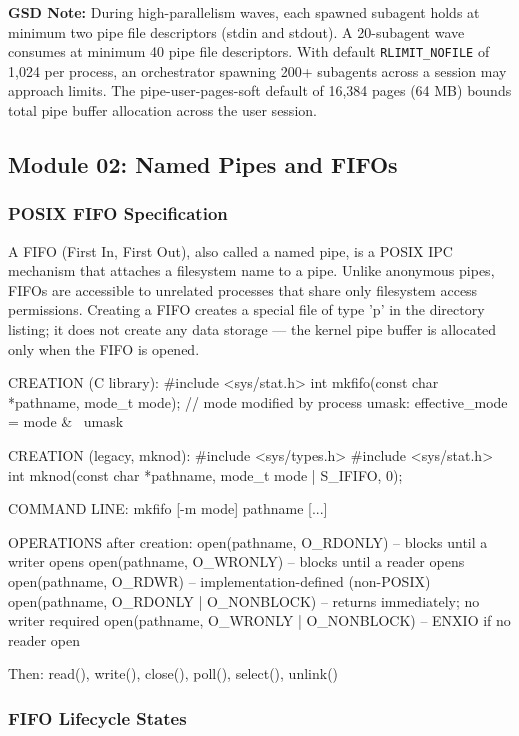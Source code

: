 \documentclass[11pt,letterpaper]{article}
\begin{document}
\textbf{GSD Note:} During high-parallelism waves, each spawned subagent holds at minimum two pipe file descriptors (stdin and stdout). A 20-subagent wave consumes at minimum 40 pipe file descriptors. With default \texttt{RLIMIT\_NOFILE} of 1,024 per process, an orchestrator spawning 200+ subagents across a session may approach limits. The pipe-user-pages-soft default of 16,384 pages (64 MB) bounds total pipe buffer allocation across the user session.

\subsection{Module 02: Named Pipes and FIFOs}

\subsubsection{POSIX FIFO Specification}

A FIFO (First In, First Out), also called a named pipe, is a POSIX IPC mechanism that attaches a filesystem name to a pipe. Unlike anonymous pipes, FIFOs are accessible to unrelated processes that share only filesystem access permissions. Creating a FIFO creates a special file of type 'p' in the directory listing; it does not create any data storage --- the kernel pipe buffer is allocated only when the FIFO is opened.

\begin{codebox}
CREATION (C library):
  #include <sys/stat.h>
  int mkfifo(const char *pathname, mode_t mode);
  // mode modified by process umask: effective_mode = mode & ~umask

CREATION (legacy, mknod):
  #include <sys/types.h>
  #include <sys/stat.h>
  int mknod(const char *pathname, mode_t mode | S_IFIFO, 0);

COMMAND LINE:
  mkfifo [-m mode] pathname [...]

OPERATIONS after creation:
  open(pathname, O_RDONLY)  -- blocks until a writer opens
  open(pathname, O_WRONLY)  -- blocks until a reader opens
  open(pathname, O_RDWR)    -- implementation-defined (non-POSIX)
  open(pathname, O_RDONLY | O_NONBLOCK)  -- returns immediately; no writer required
  open(pathname, O_WRONLY | O_NONBLOCK)  -- ENXIO if no reader open
  
  Then: read(), write(), close(), poll(), select(), unlink()
\end{codebox}

\subsubsection{FIFO Lifecycle States}
\end{document}
